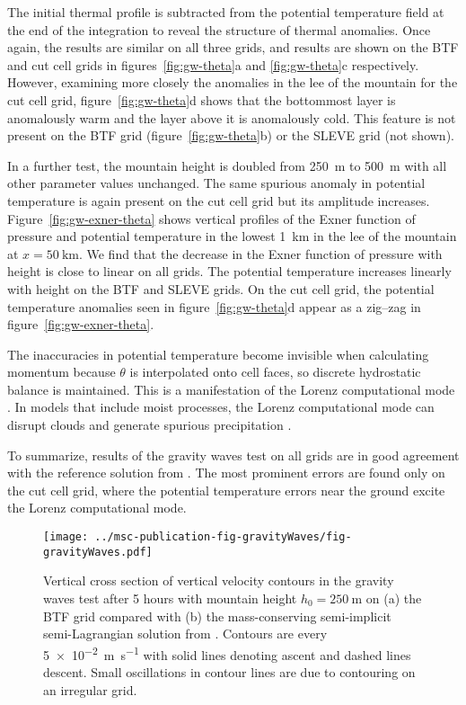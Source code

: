 \documentclass[twocol]{ametsoc}
\begin{document}
The initial thermal profile is subtracted from the potential temperature field at the end of the integration to reveal the structure of thermal anomalies.  Once again, the results are similar on all three grids, and results are shown on the BTF and cut cell grids in figures~\ref{fig:gw-theta}a and \ref{fig:gw-theta}c respectively.  However, examining more closely the anomalies in the lee of the mountain for the cut cell grid, figure~\ref{fig:gw-theta}d shows that the bottommost layer is anomalously warm and the layer above it is anomalously cold.  This feature is not present on the BTF grid (figure~\ref{fig:gw-theta}b) or the SLEVE grid (not shown).  

In a further test, the mountain height is doubled from \SI{250}{\meter} to \SI{500}{\meter} with all other parameter values unchanged.  The same spurious anomaly in potential temperature is again present on the cut cell grid but its amplitude increases.  Figure~\ref{fig:gw-exner-theta} shows vertical profiles of the Exner function of pressure and potential temperature in the lowest \SI{1}{\kilo\meter} in the lee of the mountain at \(x = \SI{50}{\kilo\meter}\).  We find that the decrease in the Exner function of pressure with height is close to linear on all grids.  The potential temperature increases linearly with height on the BTF and SLEVE grids.  On the cut cell grid, the potential temperature anomalies seen in figure~\ref{fig:gw-theta}d appear as a zig--zag in figure~\ref{fig:gw-exner-theta}.

The inaccuracies in potential temperature become invisible when calculating momentum because $\theta$ is interpolated onto cell faces, so discrete hydrostatic balance is maintained.  This is a manifestation of the Lorenz computational mode \citep{arakawa-konor1996,holdaway2013b}.  In models that include moist processes, the Lorenz computational mode can disrupt clouds and generate spurious precipitation \citep{hollingsworth1995}.

To summarize, results of the gravity waves test on all grids are in good agreement with the reference solution from \citet{melvin2010}.  The most prominent errors are found only on the cut cell grid, where the potential temperature errors near the ground excite the Lorenz computational mode.

\begin{figure}
	\centering
	\texttt{[image: ../msc-publication-fig-gravityWaves/fig-gravityWaves.pdf]}
%
	\caption{Vertical cross section of vertical velocity contours in the gravity waves test after 5 hours with mountain height $h_0 = \SI{250}{\meter}$ on (a) the BTF grid compared with (b) the mass-conserving semi-implicit semi-Lagrangian solution from \citet{melvin2010}.  Contours are every \SI{5e-2}{\meter\per\second} with solid lines denoting ascent and dashed lines descent.  Small oscillations in contour lines are due to contouring on an irregular grid.}
	\label{fig:gw-w}
\end{figure}
\end{document}
